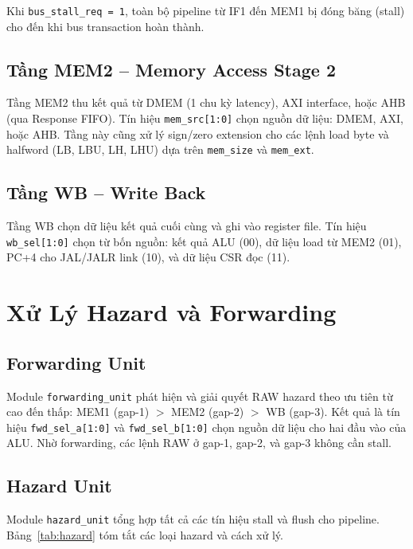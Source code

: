 Khi \texttt{bus\_stall\_req = 1}, toàn bộ pipeline từ IF1 đến MEM1 bị đóng băng (stall) cho đến khi bus transaction hoàn thành.

\subsection{Tầng MEM2 -- Memory Access Stage 2}

Tầng MEM2 thu kết quả từ DMEM (1 chu kỳ latency), AXI interface, hoặc AHB (qua Response FIFO). Tín hiệu \texttt{mem\_src[1:0]} chọn nguồn dữ liệu: DMEM, AXI, hoặc AHB. Tầng này cũng xử lý sign/zero extension cho các lệnh load byte và halfword (LB, LBU, LH, LHU) dựa trên \texttt{mem\_size} và \texttt{mem\_ext}.

\subsection{Tầng WB -- Write Back}

Tầng WB chọn dữ liệu kết quả cuối cùng và ghi vào register file. Tín hiệu \texttt{wb\_sel[1:0]} chọn từ bốn nguồn: kết quả ALU (00), dữ liệu load từ MEM2 (01), PC+4 cho JAL/JALR link (10), và dữ liệu CSR đọc (11).

\section{Xử Lý Hazard và Forwarding}

\subsection{Forwarding Unit}

Module \texttt{forwarding\_unit} phát hiện và giải quyết RAW hazard theo ưu tiên từ cao đến thấp: MEM1 (gap-1) $>$ MEM2 (gap-2) $>$ WB (gap-3). Kết quả là tín hiệu \texttt{fwd\_sel\_a[1:0]} và \texttt{fwd\_sel\_b[1:0]} chọn nguồn dữ liệu cho hai đầu vào của ALU. Nhờ forwarding, các lệnh RAW ở gap-1, gap-2, và gap-3 không cần stall.

\subsection{Hazard Unit}

Module \texttt{hazard\_unit} tổng hợp tất cả các tín hiệu stall và flush cho pipeline. Bảng~\ref{tab:hazard} tóm tắt các loại hazard và cách xử lý.

